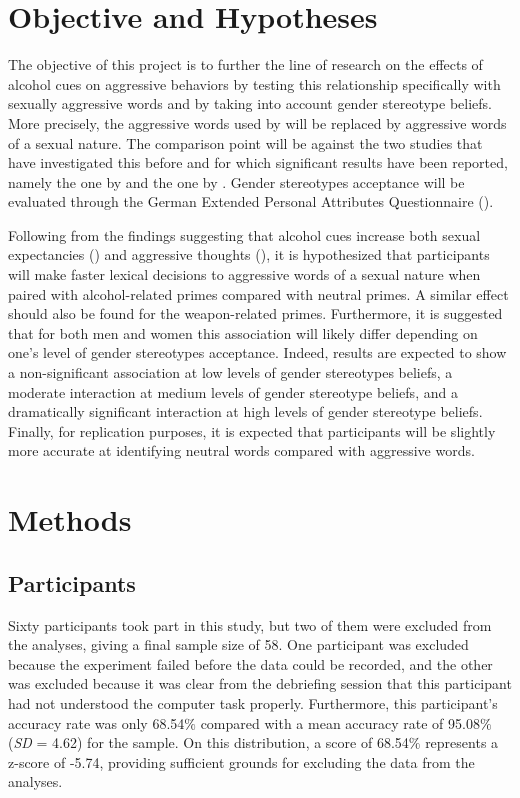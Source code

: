 \documentclass[serif, twocolumn, numeric, empirical]{jote-article}
\begin{document}
\section*{Objective and Hypotheses}
The objective of this project is to further the line of research on the effects of alcohol cues on aggressive behaviors by testing this relationship specifically with sexually aggressive words and by taking into account gender stereotype beliefs. More precisely, the aggressive words used by \textcite{BartholowHeinz2006} will be replaced by aggressive words of a sexual nature. The comparison point will be against the two studies that have investigated this before and for which significant results have been reported, namely the one by \textcite{BartholowHeinz2006} and the one by \textcite{SubraMullerBegueLBushmanDelmas2010}. Gender stereotypes acceptance will be evaluated through the German Extended Personal Attributes Questionnaire (\cite{RungeFreyGollwitzerHelmreichSpence1981}).

Following from the findings suggesting that alcohol cues increase both sexual expectancies (\cite{FriedmanMcCarthyForsterJDenzler2005}) and aggressive thoughts (\cite{BartholowHeinz2006}), it is hypothesized that participants will make faster lexical decisions to aggressive words of a sexual nature when paired with alcohol-related primes compared with neutral primes. A similar effect should also be found for the weapon-related primes. Furthermore, it is suggested that for both men and women this association will likely differ depending on one’s level of gender stereotypes acceptance. Indeed, results are expected to show a non-significant association at low levels of gender stereotypes beliefs, a moderate interaction at medium levels of gender stereotype beliefs, and a dramatically significant interaction at high levels of gender stereotype beliefs. Finally, for replication purposes, it is expected that participants will be slightly more accurate at identifying neutral words compared with aggressive words. 

{}
\section*{Methods} %
\label{sec:methods}

{}
\subsection*{Participants}
Sixty participants took part in this study, but two of them were excluded from the analyses, giving a final sample size of 58. One participant was excluded because the experiment failed before the data could be recorded, and the other was excluded because it was clear from the debriefing session that this participant had not understood the computer task properly. Furthermore, this participant’s accuracy rate was only 68.54$\%$  compared with a mean accuracy rate of 95.08$\%$  (\textit{SD }= 4.62) for the sample. On this distribution, a score of 68.54$\%$  represents a z-score of -5.74, providing sufficient grounds for excluding the data from the analyses. 
\end{document}
